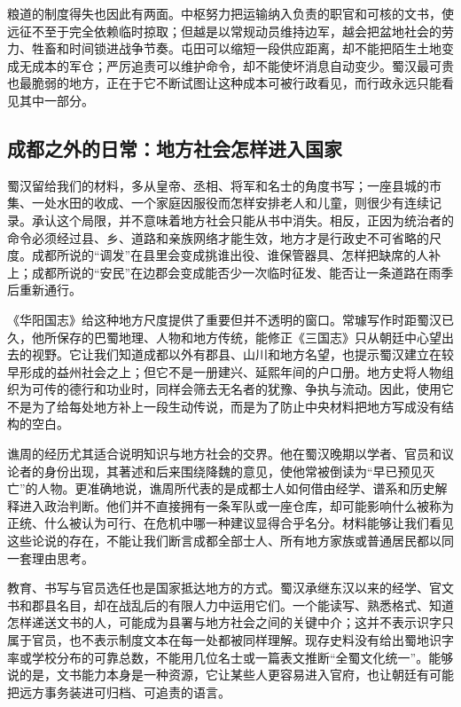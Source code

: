 粮道的制度得失也因此有两面。中枢努力把运输纳入负责的职官和可核的文书，使远征不至于完全依赖临时掠取；但越是以常规动员维持边军，越会把盆地社会的劳力、牲畜和时间锁进战争节奏。屯田可以缩短一段供应距离，却不能把陌生土地变成无成本的军仓；严厉追责可以维护命令，却不能使坏消息自动变少。蜀汉最可贵也最脆弱的地方，正在于它不断试图让这种成本可被行政看见，而行政永远只能看见其中一部分。

\subsection{成都之外的日常：地方社会怎样进入国家}

蜀汉留给我们的材料，多从皇帝、丞相、将军和名士的角度书写；一座县城的市集、一处水田的收成、一个家庭因服役而怎样安排老人和儿童，则很少有连续记录。承认这个局限，并不意味着地方社会只能从书中消失。相反，正因为统治者的命令必须经过县、乡、道路和亲族网络才能生效，地方才是行政史不可省略的尺度。成都所说的“调发”在县里会变成挑谁出役、谁保管器具、怎样把缺席的人补上；成都所说的“安民”在边郡会变成能否少一次临时征发、能否让一条道路在雨季后重新通行。

《华阳国志》给这种地方尺度提供了重要但并不透明的窗口。常璩写作时距蜀汉已久，他所保存的巴蜀地理、人物和地方传统，能修正《三国志》只从朝廷中心望出去的视野。它让我们知道成都以外有郡县、山川和地方名望，也提示蜀汉建立在较早形成的益州社会之上；但它不是一册建兴、延熙年间的户口册。地方史将人物组织为可传的德行和功业时，同样会筛去无名者的犹豫、争执与流动。因此，使用它不是为了给每处地方补上一段生动传说，而是为了防止中央材料把地方写成没有结构的空白。

谯周的经历尤其适合说明知识与地方社会的交界。他在蜀汉晚期以学者、官员和议论者的身份出现，其著述和后来围绕降魏的意见，使他常被倒读为“早已预见灭亡”的人物。更准确地说，谯周所代表的是成都士人如何借由经学、谱系和历史解释进入政治判断。他们并不直接拥有一条军队或一座仓库，却可能影响什么被称为正统、什么被认为可行、在危机中哪一种建议显得合乎名分。材料能够让我们看见这些论说的存在，不能让我们断言成都全部士人、所有地方家族或普通居民都以同一套理由思考。

教育、书写与官员选任也是国家抵达地方的方式。蜀汉承继东汉以来的经学、官文书和郡县名目，却在战乱后的有限人力中运用它们。一个能读写、熟悉格式、知道怎样递送文书的人，可能成为县署与地方社会之间的关键中介；这并不表示识字只属于官员，也不表示制度文本在每一处都被同样理解。现存史料没有给出蜀地识字率或学校分布的可靠总数，不能用几位名士或一篇表文推断“全蜀文化统一”。能够说的是，文书能力本身是一种资源，它让某些人更容易进入官府，也让朝廷有可能把远方事务装进可归档、可追责的语言。

